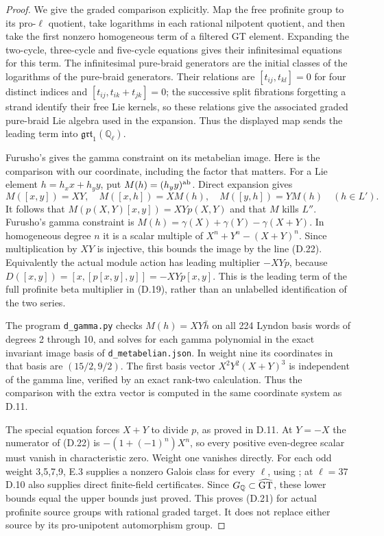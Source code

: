 \begin{proof}
We give the graded comparison explicitly. Map the free profinite group to its pro-$\ell$ quotient, take logarithms in each rational nilpotent quotient, and then take the first nonzero homogeneous term of a filtered GT element. Expanding the two-cycle, three-cycle and five-cycle equations gives their infinitesimal equations for this term. The infinitesimal pure-braid generators are the initial classes of the logarithms of the pure-braid generators. Their relations are
$[t_{ij},t_{kl}]=0$ for four distinct indices and
$[t_{ij},t_{ik}+t_{jk}]=0$; the successive split fibrations forgetting a strand identify their free Lie kernels, so these relations give the associated graded pure-braid Lie algebra used in the expansion. Thus the displayed map sends the leading term into $\mathfrak{grt}_1(\mathbb Q_\ell)$.

Furusho's \cite[Corollary 0.3, Theorem 0.5, Proposition 5.1 and Lemma 5.2]{dFurusho2011} gives the gamma constraint on its metabelian image. Here is the comparison with our coordinate, including the factor that matters. For a Lie element $h=h_xx+h_yy$, put $M(h)=(h_yy)^{\rm ab}$. Direct expansion gives
\[
 M([x,y])=XY,\quad M([x,h])=XM(h),\quad M([y,h])=YM(h)
 \quad(h\in L').
\]
It follows that $M(p(X,Y)[x,y])=XYp(X,Y)$ and that $M$ kills $L''$. Furusho's gamma constraint is
$M(h)=\gamma(X)+\gamma(Y)-\gamma(X+Y)$.
In homogeneous degree $n$ it is a scalar multiple of
$X^n+Y^n-(X+Y)^n$. Since multiplication by $XY$ is injective, this bounds the image by the line (D.22). Equivalently the actual module action has leading multiplier $-XYp$, because
$D([x,y])=[x,[p[x,y],y]]=-XYp[x,y]$.
This is the leading term of the full profinite beta multiplier in (D.19), rather than an unlabelled identification of the two series.

The program \texttt{d\_gamma.py} checks $M(h)=XY\bar h$ on all 224 Lyndon basis words of degrees 2 through 10, and solves for each gamma polynomial in the exact invariant image basis of \texttt{d\_metabelian.json}. In weight nine its coordinates in that basis are $(15/2,9/2)$. The first basis vector $X^2Y^2(X+Y)^3$ is independent of the gamma line, verified by an exact rank-two calculation. Thus the comparison with the extra vector is computed in the same coordinate system as D.11.

The special equation forces $X+Y$ to divide $p$, as proved in D.11. At $Y=-X$ the numerator of (D.22) is $-(1+(-1)^n)X^n$, so every positive even-degree scalar must vanish in characteristic zero. Weight one vanishes directly. For each odd weight 3,5,7,9, E.3 supplies a nonzero Galois class for every $\ell$, using \cite[Theorem 8.4, \S8.4, Lemma 8.5 and Remark 8.6]{E_HainMatsumoto}; at $\ell=37$ D.10 also supplies direct finite-field certificates. Since $G_{\mathbb Q}\subset\widehat{\rm GT}$, these lower bounds equal the upper bounds just proved. This proves (D.21) for actual profinite source groups with rational graded target. It does not replace either source by its pro-unipotent automorphism group.
\end{proof}


